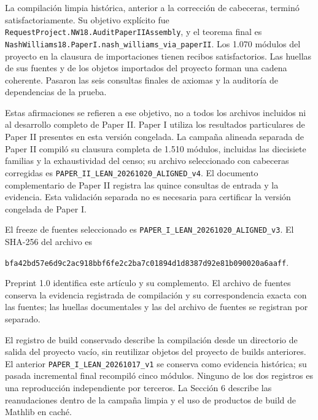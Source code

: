 \documentclass[spanish,11pt,a4paper]{article}
\begin{document}
La compilación limpia histórica, anterior a la corrección de cabeceras, terminó satisfactoriamente. Su objetivo explícito fue \texttt{Request\allowbreak{}Project.\allowbreak{}NW18.\allowbreak{}Audit\allowbreak{}Paper\allowbreak{}IIAssembly}, y el teorema final es \texttt{Nash\allowbreak{}Williams18.\allowbreak{}Paper\allowbreak{}I.\allowbreak{}nash\_\allowbreak{}williams\_\allowbreak{}via\_\allowbreak{}paper\allowbreak{}II}. Los 1.070 módulos del proyecto en la clausura de importaciones tienen recibos satisfactorios. Las huellas de sus fuentes y de los objetos importados del proyecto forman una cadena coherente. Pasaron las seis consultas finales de axiomas y la auditoría de dependencias de la prueba.

Estas afirmaciones se refieren a ese objetivo, no a todos los archivos incluidos ni al desarrollo completo de Paper II. Paper I utiliza los resultados particulares de Paper II presentes en esta versión congelada. La campaña alineada separada de Paper II compiló su clausura completa de 1.510 módulos, incluidas las diecisiete familias y la exhaustividad del censo; su archivo seleccionado con cabeceras corregidas es \texttt{PAPER\_\allowbreak{}II\_\allowbreak{}LEAN\_\allowbreak{}20261020\_\allowbreak{}ALIGNED\_\allowbreak{}v4}. El documento complementario de Paper II registra las quince consultas de entrada y la evidencia. Esta validación separada no es necesaria para certificar la versión congelada de Paper I.

El freeze de fuentes seleccionado es \texttt{PAPER\_\allowbreak{}I\_\allowbreak{}LEAN\_\allowbreak{}20261020\_\allowbreak{}ALIGNED\_\allowbreak{}v3}. El SHA-256 del archivo es

\texttt{bfa42bd5\allowbreak{}7e6d9c2a\allowbreak{}c918bbf6\allowbreak{}fe2c2ba7\allowbreak{}c01894d1\allowbreak{}d8387d92\allowbreak{}e81b0900\allowbreak{}20a6aaff}.

Preprint 1.0 identifica este artículo y su complemento. El archivo de fuentes conserva la evidencia registrada de compilación y su correspondencia exacta con las fuentes; las huellas documentales y las del archivo de fuentes se registran por separado.

El registro de build conservado describe la compilación desde un directorio de salida del proyecto vacío, sin reutilizar objetos del proyecto de builds anteriores. El anterior \texttt{PAPER\_\allowbreak{}I\_\allowbreak{}LEAN\_\allowbreak{}20261017\_\allowbreak{}v1} se conserva como evidencia histórica; su pasada incremental final recompiló cinco módulos. Ninguno de los dos registros es una reproducción independiente por terceros. La Sección 6 describe las reanudaciones dentro de la campaña limpia y el uso de productos de build de Mathlib en caché.
\end{document}
